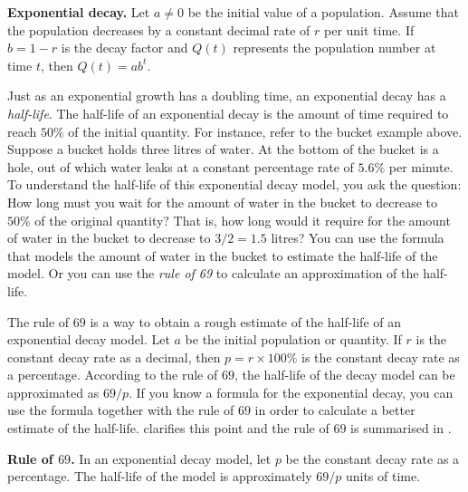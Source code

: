 \documentclass[a4paper,oneside,12pt]{article}
\begin{document}
\begin{theorem}
\label{thm:exponential_decay}
\textbf{Exponential decay.}
Let $a \neq 0$ be the initial value of a population.  Assume that the
population decreases by a constant decimal rate of $r$ per unit time.
If $b = 1 - r$ is the decay factor and $Q(t)$ represents the
population number at time $t$, then $Q(t) = ab^t$.
\end{theorem}

Just as an exponential growth has a doubling time, an exponential
decay has a \emph{half-life}.  The half-life of an exponential decay
is the amount of time required to reach $50\%$ of the initial
quantity.  For instance, refer to the bucket example above.  Suppose a
bucket holds three litres of water.  At the bottom of the bucket is a
hole, out of which water leaks at a constant percentage rate of
$5.6\%$ per minute.  To understand the half-life of this exponential
decay model, you ask the question:  How long must you wait for the
amount of water in the bucket to decrease to $50\%$ of the original
quantity?  That is, how long would it require for the amount of water
in the bucket to decrease to $3 / 2 = 1.5$ litres?  You can use the
formula that models the amount of water in the bucket to estimate the
half-life of the model.  Or you can use the \emph{rule of 69} to
calculate an approximation of the half-life.

The rule of $69$ is a way to obtain a rough estimate of the half-life
of an exponential decay model.  Let $a$ be the initial population or
quantity.  If $r$ is the constant decay rate as a decimal, then
$p = r \times 100\%$ is the constant decay rate as a percentage.
According to the rule of $69$, the half-life of the decay model can be
approximated as $69 / p$.  If you know a formula for the exponential
decay, you can use the formula together with the rule of $69$ in order
to calculate a better estimate of the half-life.
 clarifies this point and the rule of $69$ is
summarised in .

\begin{theorem}
\label{thm:rule_of_69}
\textbf{Rule of $69$.}
In an exponential decay model, let $p$ be the constant decay rate as a
percentage.  The half-life of the model is approximately $69 / p$
units of time.
\end{theorem}
\end{document}
